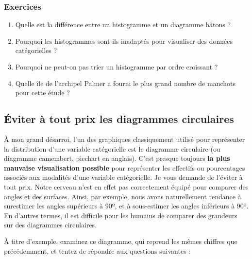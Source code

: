 \documentclass[
  letterpaper,
  DIV=11,
  numbers=noendperiod]{scrreprt}
\providecommand{\tightlist}{%
  \setlength{\itemsep}{0pt}\setlength{\parskip}{0pt}}\usepackage{longtable,booktabs,array}
\begin{document}
\hypertarget{sec-Exo-6}{%
\subsubsection{Exercices}\label{sec-Exo-6}}

\begin{enumerate}
\def\labelenumi{\arabic{enumi}.}
\tightlist
\item
  Quelle est la différence entre un histogramme et un diagramme bâtons ?
\item
  Pourquoi les histogrammes sont-ils inadaptés pour visualiser des
  données catégorielles ?
\item
  Pourquoi ne peut-on pas trier un histogramme par ordre croissant ?
\item
  Quelle île de l'archipel Palmer a fourni le plus grand nombre de
  manchots pour cette étude ?
\end{enumerate}

\hypertarget{uxe9viter-uxe0-tout-prix-les-diagrammes-circulaires}{%
\subsection{Éviter à tout prix les diagrammes
circulaires}\label{uxe9viter-uxe0-tout-prix-les-diagrammes-circulaires}}

À mon grand désarroi, l'un des graphiques classiquement utilisé pour
représenter la distribution d'une variable catégorielle est le diagramme
circulaire (ou diagramme camembert, piechart en anglais). C'est presque
toujours \textbf{la plus mauvaise visualisation possible} pour
représenter les effectifs ou pourcentages associés aux modalités d'une
variable catégorielle. Je vous demande de l'éviter à tout prix. Notre
cerveau n'est en effet pas correctement équipé pour comparer des angles
et des surfaces. Ainsi, par exemple, nous avons naturellement tendance à
surestimer les angles supérieurs à 90º, et à sous-estimer les angles
inférieurs à 90º. En d'autres termes, il est difficile pour les humains
de comparer des grandeurs sur des diagrammes circulaires.

À titre d'exemple, examinez ce diagramme, qui reprend les mêmes chiffres
que précédemment, et tentez de répondre aux questions suivantes :
\end{document}

